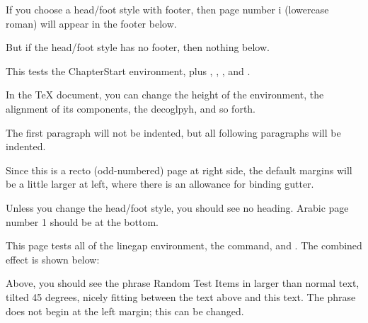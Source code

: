 \documentclass[test]{novel} %
\begin{document}
\frontmatter %

\thispagestyle{footer}
\vspace*{5\nbs}
\begin{center}
\par
\vspace{1.5\nbs}
\par
\vspace{4\nbs}
\vspace{2\nbs}
\par
\vfill
If you choose a head/foot style with footer, then page number i (lowercase roman) will appear in the footer below.\par
But if the head/foot style has no footer, then nothing below.\par
\end{center}
\clearpage


\mainmatter

\begin{ChapterStart}[10]
\vspace*{3\nbs}
\end{ChapterStart}

This tests the ChapterStart environment, plus \string\ChaterTitle, \string\ChapterSubtitle, \string\ChapterDeco, and \string\decoglyph.

In the TeX document, you can change the height of the environment, the alignment of its components, the decoglpyh, and so forth.

The first paragraph will not be indented, but all following paragraphs will be indented.

Since this is a recto (odd-numbered) page at right side, the default margins will be a little larger at left, where there is an allowance for binding gutter.

Unless you change the head/foot style, you should see no heading. Arabic page number 1 should be at the bottom.

\clearpage



This page tests all of the linegap environment, the \string\charscale\space command, and \string\rotatebox. The combined effect is shown below:
\begin{linegap}{10}
\vspace{1.5\nbs}
\end{linegap}
Above, you should see the phrase Random Test Items in larger than normal text, tilted 45 degrees, nicely fitting between the text above and this text.  The phrase does not begin at the left margin; this can be changed.
\end{document}
